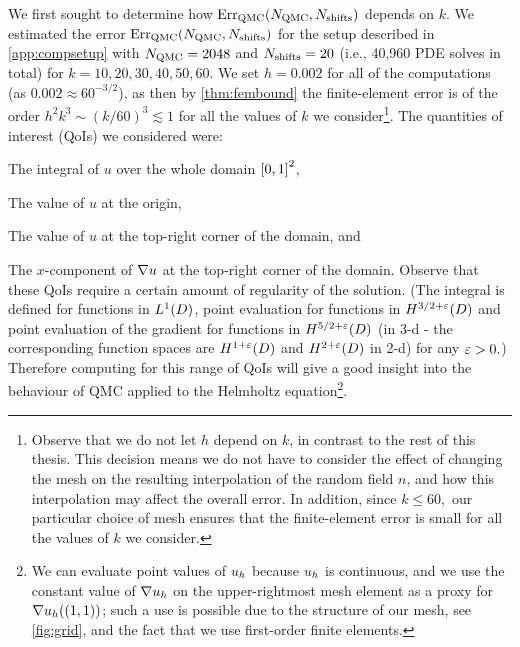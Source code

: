 We first sought to determine how $\QMCerror{\NQMC}{\Nshifts}$ depends on $k.$ We estimated the error $\QMCerror{\NQMC}{\Nshifts}$ for the setup described in \cref{app:compsetup} with $N_{\mathrm{QMC}} = 2048$ and $N_{\mathrm{shifts}}=20$ (i.e., 40,960 PDE solves in total) for $k = 10,20,30,40,50,60$. We set $h = 0.002$ for all of the computations (as $0.002 \approx 60^{-3/2}$), as then by \cref{thm:fembound} the finite-element error is of the order $h^2k^3 \sim (k/60)^3 \lesssim 1$ for all the values of $k$ we consider\footnote{Observe that we do not let $h$ depend on $k$, in contrast to the rest of this thesis. This decision means we do not have to consider the effect of changing the mesh on the resulting interpolation of the random field $n$, and how this interpolation may affect the overall error. In addition, since $k \leq 60,$ our particular choice of mesh ensures that the finite-element error is small for all the values of $k$ we consider.}. The quantities of interest (QoIs) we considered were:
\bit
\item The integral of $u$ over the whole domain $\mleft[0,1\mright]^2$,
\item The value of $u$ at the origin,
\item The value of $u$ at the top-right corner of the domain, and
\item The $x$-component of $\nabla u$ at the top-right corner of the domain.
  \eit
  Observe that these QoIs require a certain amount of regularity of the solution. (The integral is defined for functions in $\LoD$, point evaluation for functions in $\Hfn{}{3/2 + \eps}{D}$ and point evaluation of the gradient for functions in $\Hfn{}{5/2+\eps}{D}$ (in 3-d - the corresponding function spaces are $\Hfn{}{1+\eps}{D}$ and $\Hfn{}{2+\eps}{D}$ in 2-d) for any $\varepsilon > 0.$) Therefore computing for this range of QoIs will give a good insight into the behaviour of QMC applied to the Helmholtz equation\footnote{We can evaluate point values of $u_{h}$ because $u_{h}$ is continuous, and we use the constant value of $\nabla u_{h}$ on the upper-rightmost mesh element as a proxy for $\nabla u_{h}((1,1))$; such a use is possible due to the structure of our mesh, see \cref{fig:grid}, and the fact that we use first-order finite elements.}.


